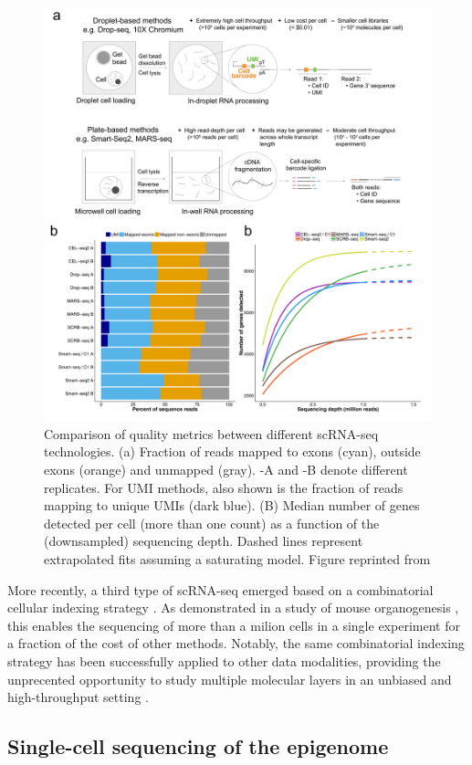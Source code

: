 \begin{figure}[H]
	\centering
	\includegraphics[width=0.85\linewidth]{scRNA_seq_comparison}
	\caption[]{Comparison of quality metrics between different scRNA-seq technologies. (a) Fraction of reads mapped to exons (cyan), outside exons (orange) and unmapped (gray). -A and -B denote different replicates. For UMI methods, also shown is the fraction of reads mapping to unique UMIs (dark blue). (B) Median number of genes detected per cell (more than one count) as a function of the (downsampled) sequencing depth. Dashed lines represent extrapolated fits assuming a saturating model. Figure reprinted from \cite{Ziegenhain2017} }
	\label{fig:scRNA_seq_comparison}
\end{figure}

More recently, a third type of scRNA-seq emerged based on a combinatorial cellular indexing strategy \cite{Cao2017,Rosenberg2018}. As demonstrated in a study of mouse organogenesis \cite{Cao2019}, this enables the sequencing of more than a milion cells in a single experiment for a fraction of the cost of other methods. Notably, the same combinatorial indexing strategy has been successfully applied to other data modalities, providing the unprecented opportunity to study multiple molecular layers in an unbiased and high-throughput setting \cite{Vitak2017, Ramani2017, Mulqueen2018}.

\subsection{Single-cell sequencing of the epigenome}

